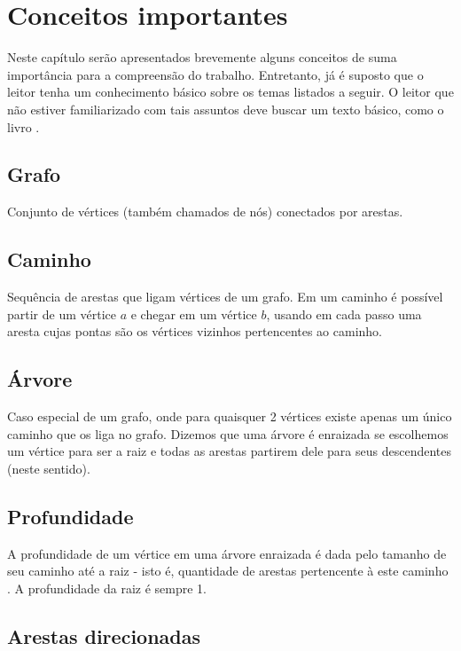 \chapter{Conceitos importantes}
\label{cap:conceitos-importantes}

Neste capítulo serão apresentados brevemente alguns conceitos de suma importância 
para a compreensão do trabalho. Entretanto, já é suposto que o leitor tenha um 
conhecimento básico sobre os temas listados a seguir. O leitor que não estiver familiarizado com tais assuntos deve buscar um texto básico, como o livro \cite{cormen}.

\section{Grafo}

Conjunto de vértices (também chamados de nós) conectados por arestas.

\section{Caminho}

Sequência de arestas que ligam vértices de um grafo. Em um caminho é possível 
partir de um vértice $a$ e chegar em um vértice $b$, usando em cada passo uma aresta cujas pontas são os vértices vizinhos pertencentes ao caminho.

\section{Árvore}

Caso especial de um grafo, onde para quaisquer 2 vértices existe apenas um único caminho que os liga no grafo. Dizemos que uma árvore é enraizada se escolhemos um vértice para ser a raiz e todas as arestas partirem dele para seus descendentes (neste sentido).

\section{Profundidade} 

A profundidade de um vértice em uma árvore enraizada é dada pelo tamanho de seu caminho
até a raiz - isto é, quantidade de arestas pertencente à este caminho . A profundidade da raiz é sempre 1.

\section{Arestas direcionadas}


